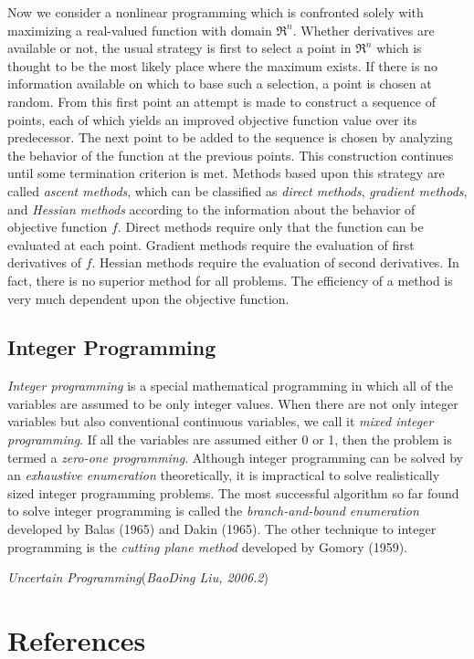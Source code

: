 Now we consider a nonlinear programming which is confronted solely with
maximizing a real-valued function with domain $\Re^n$.  Whether derivatives are
available or not, the usual strategy is first to select a point in $\Re^n$ which
is thought to be the most likely place where the maximum exists. If there is no
information available on which to base such a selection, a point is chosen at
random. From this first point an attempt is made to construct a sequence of
points, each of which yields an improved objective function value over its
predecessor. The next point to be added to the sequence is chosen by analyzing
the behavior of the function at the previous points. This construction continues
until some termination criterion is met. Methods based upon this strategy are
called {\em ascent methods}, which can be classified as {\em direct methods},
{\em gradient methods}, and {\em Hessian methods} according to the information
about the behavior of objective function $f$. Direct methods require only that
the function can be evaluated at each point. Gradient methods require the
evaluation of first derivatives of $f$. Hessian methods require the evaluation
of second derivatives. In fact, there is no superior method for all
problems. The efficiency of a method is very much dependent upon the objective
function.

\subsection{Integer Programming}

{\em Integer programming} is a special mathematical programming in which all of
the variables are assumed to be only integer values. When there are not only
integer variables but also conventional continuous variables, we call it {\em
  mixed integer programming}. If all the variables are assumed either 0 or 1,
then the problem is termed a {\em zero-one programming}. Although integer
programming can be solved by an {\em exhaustive enumeration} theoretically, it
is impractical to solve realistically sized integer programming problems. The
most successful algorithm so far found to solve integer programming is called
the {\em branch-and-bound enumeration} developed by Balas (1965) and Dakin
(1965). The other technique to integer programming is the {\em cutting plane
  method} developed by Gomory (1959).

\hfill\textit{Uncertain Programming\/}\quad(\textsl{BaoDing Liu, 2006.2})

\section*{References}

